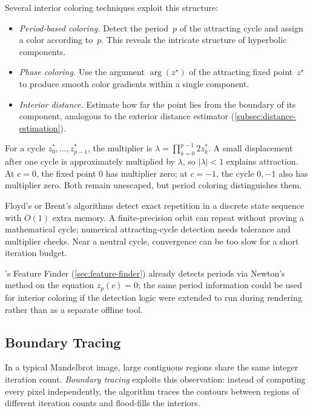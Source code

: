 Several interior coloring techniques exploit this structure:
\begin{itemize}
  \item \emph{Period-based coloring.}  Detect the period~$p$ of the
        attracting cycle and assign a color according to~$p$.  This
        reveals the intricate structure of hyperbolic components.
  \item \emph{Phase coloring.}  Use the argument
        $\arg(z^\star)$ of the attracting fixed point~$z^\star$ to
        produce smooth color gradients within a single component.
  \item \emph{Interior distance.}  Estimate how far the point lies from
        the boundary of its component, analogous to the exterior
        distance estimator (\cref{subsec:distance-estimation}).
\end{itemize}

For a cycle $z_0^*,\ldots,z_{p-1}^*$, the multiplier is
$\lambda=\prod_{k=0}^{p-1}2z_k^*$.  A small displacement after one
cycle is approximately multiplied by $\lambda$, so $|\lambda|<1$
explains attraction.  At $c=0$, the fixed point $0$ has multiplier zero;
at $c=-1$, the cycle $0,-1$ also has multiplier zero.  Both remain
unescaped, but period coloring distinguishes them.

Floyd's or Brent's algorithms detect exact repetition in a discrete state
sequence with $O(1)$ extra memory.  A finite-precision orbit can repeat
without proving a mathematical cycle; numerical attracting-cycle detection
needs tolerance and multiplier checks.  Near a neutral cycle, convergence
can be too slow for a short iteration budget.

\FractalShark{}'s Feature Finder (\cref{sec:feature-finder}) already
detects periods via Newton's method on the equation $z_p(c) = 0$; the
same period information could be used for interior coloring if the
detection logic were extended to run during rendering rather than as a
separate offline tool.

\subsection{Boundary Tracing}
\label{subsec:boundary-tracing}

In a typical Mandelbrot image, large contiguous regions share the same
integer iteration count.  \emph{Boundary tracing} exploits this
observation: instead of computing every pixel independently, the
algorithm traces the contours between regions of different iteration
counts and flood-fills the interiors.

